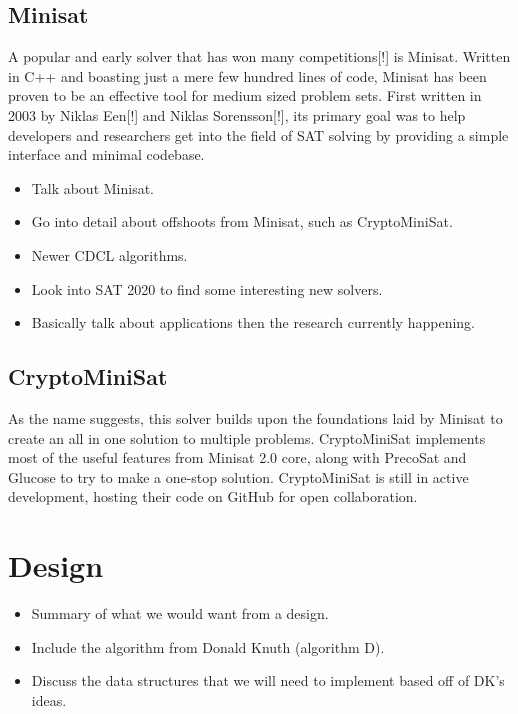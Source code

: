 \documentclass{article}
\begin{document}
\subsection{Minisat}
A popular and early solver that has won many competitions[!] is Minisat. Written in C++ and boasting
just a mere few hundred lines of code, Minisat has been proven to be an effective tool for medium
sized problem sets. First written in 2003 by Niklas Een[!] and Niklas Sorensson[!], its primary goal
was to help developers and researchers get into the field of SAT solving by providing a simple
interface and minimal codebase.

\begin{itemize}
    \item Talk about Minisat.
    \item Go into detail about offshoots from Minisat, such as CryptoMiniSat.
    \item Newer CDCL algorithms.
    \item Look into SAT 2020 to find some interesting new solvers.
    \item Basically talk about applications then the research currently happening.
\end{itemize}

\subsection{CryptoMiniSat}
As the name suggests, this solver builds upon the foundations laid by Minisat to create an all in
one solution to multiple problems. CryptoMiniSat implements most of the useful features from Minisat
2.0 core, along with PrecoSat and Glucose to try to make a one-stop solution. CryptoMiniSat is still
in active development, hosting their code on GitHub for open collaboration.


\section{Design}
\begin{itemize}
    \item Summary of what we would want from a design.
    \item Include the algorithm from Donald Knuth (algorithm D).
    \item Discuss the data structures that we will need to implement based off of DK's ideas.
\end{itemize}
\end{document}
